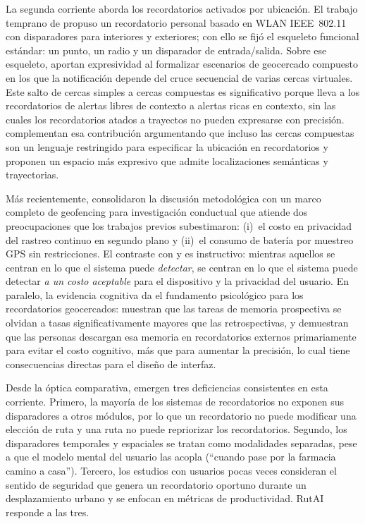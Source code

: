 \documentclass[a4paper,fleqn]{cas-sc}
\newcommand{\RUTAI}{RutAI\xspace}
\begin{document}
	La segunda corriente aborda los recordatorios activados por ubicaci\'on. El trabajo temprano de \citet{lin2014lbr} propuso un recordatorio personal basado en WLAN IEEE~802.11 con disparadores para interiores y exteriores; con ello se fij\'o el esqueleto funcional est\'andar: un punto, un radio y un disparador de entrada/salida. Sobre ese esqueleto, \citet{garzon2014geofencing} aportan expresividad al formalizar escenarios de geocercado compuesto en los que la notificaci\'on depende del cruce secuencial de varias cercas virtuales. Este salto de cercas simples a cercas compuestas es significativo porque lleva a los recordatorios de alertas libres de contexto a alertas ricas en contexto, sin las cuales los recordatorios atados a trayectos no pueden expresarse con precisi\'on. \citet{wang2015beyond} complementan esa contribuci\'on argumentando que incluso las cercas compuestas son un lenguaje restringido para especificar la ubicaci\'on en recordatorios y proponen un espacio m\'as expresivo que admite localizaciones sem\'anticas y trayectorias.
	
	M\'as recientemente, \citet{shevchenko2024geofencing} consolidaron la discusi\'on metodol\'ogica con un marco completo de geofencing para investigaci\'on conductual que atiende dos preocupaciones que los trabajos previos subestimaron: (i)~el costo en privacidad del rastreo continuo en segundo plano y (ii)~el consumo de bater\'ia por muestreo GPS sin restricciones. El contraste con \citet{lin2014lbr} y \citet{garzon2014geofencing} es instructivo: mientras aquellos se centran en lo que el sistema puede \emph{detectar}, \citet{shevchenko2024geofencing} se centran en lo que el sistema puede detectar \emph{a un costo aceptable} para el dispositivo y la privacidad del usuario. En paralelo, la evidencia cognitiva da el fundamento psicol\'ogico para los recordatorios geocercados: \citet{rummel2023prospective} muestran que las tareas de memoria prospectiva se olvidan a tasas significativamente mayores que las retrospectivas, y \citet{ball2025offloading} demuestran que las personas descargan esa memoria en recordatorios externos primariamente para evitar el costo cognitivo, m\'as que para aumentar la precisi\'on, lo cual tiene consecuencias directas para el dise\~no de interfaz.
	
	Desde la \'optica comparativa, emergen tres deficiencias consistentes en esta corriente. Primero, la mayor\'ia de los sistemas de recordatorios no exponen sus disparadores a otros m\'odulos, por lo que un recordatorio no puede modificar una elecci\'on de ruta y una ruta no puede repriorizar los recordatorios. Segundo, los disparadores temporales y espaciales se tratan como modalidades separadas, pese a que el modelo mental del usuario las acopla (``cuando pase por la farmacia camino a casa''). Tercero, los estudios con usuarios pocas veces consideran el sentido de seguridad que genera un recordatorio oportuno durante un desplazamiento urbano y se enfocan en m\'etricas de productividad. \RUTAI responde a las tres.
	
\end{document}
